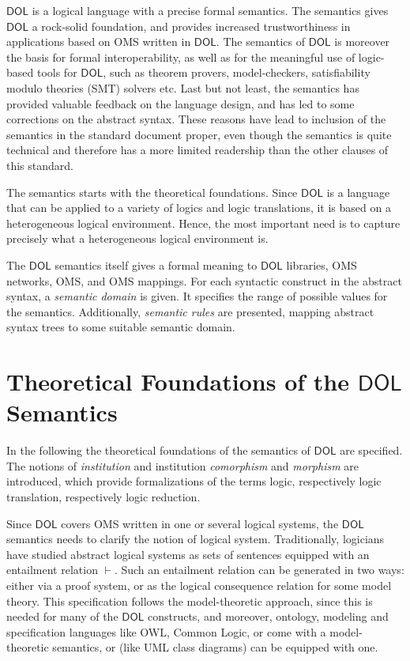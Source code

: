 \documentclass[10pt,fleqn,final]{scrreprt}
\newcommand{\cbs}[0]{\color{red}\xspace} %
\newcommand{\cbe}[0]{\color{black}\xspace} %
\newcommand*{\termref}[1]{\index{#1}#1\xspace}
\newcommand*{\DOL}{\ensuremath{\mathsf{DOL}}\xspace}
\newcommand{\sclause}[1]{\section{#1}}
\newenvironment{definitions}[0]{\medskip }{}
\begin{document}
\begin{definitions}
\DOL is a logical language with a precise formal semantics.  The
semantics gives \DOL a rock-solid foundation, and provides increased
trustworthiness in applications based on OMS written in \DOL.  The
semantics of \DOL is moreover the basis for formal interoperability, as
well as for the meaningful use of logic-based tools for \DOL, such as
theorem provers, model-checkers,\cbs satisfiability modulo theories (SMT)\cbe solvers etc.  Last but not least,
the semantics has provided valuable feedback on the language design,
and has led to some corrections on the abstract syntax.  These
reasons have lead to inclusion of the semantics in the standard
document proper, even though the semantics is quite technical and
therefore has a more limited readership than the other clauses of
this standard.

The semantics starts with the theoretical foundations. Since \DOL is a
language that can be applied to a variety of logics and logic
translations, it is based on\cbs a\cbe heterogeneous logical environment.
Hence, the most important need is to capture precisely what a
heterogeneous logical environment is.

The \DOL semantics itself gives a formal meaning to \DOL libraries, OMS
networks, OMS, and OMS mappings. For each syntactic construct
in the abstract syntax,
a \emph{semantic domain} is given. It specifies the range of possible
values for the semantics. Additionally, \emph{semantic rules} are
presented, mapping abstract syntax trees to some suitable semantic
domain.

\sclause{Theoretical Foundations of the \DOL Semantics}
\label{s:foundations}

\cbs In the following the theoretical foundations of the semantics of \DOL are  specified.\cbe
The notions of \emph{institution} and institution 
\emph{comorphism} and \emph{morphism} are introduced, which provide formalizations of the terms 
\termref{logic}, respectively \termref{logic translation}, respectively  \termref{logic reduction}. 

Since \DOL covers OMS written in one or several logical systems, the
\DOL semantics needs to clarify the notion of logical
system. Traditionally, logicians have studied abstract logical systems
as sets of sentences equipped with an entailment relation
$\vdash$. Such an entailment relation can be generated in two ways:
either via a proof system, or as the logical consequence relation for
some model theory.\cbs  This specification follows\cbe the model-theoretic approach, since
this is needed for many of the \DOL constructs, and moreover, ontology,
modeling and specification languages like OWL, Common Logic, or \CASL
come with a model-theoretic semantics, or (like UML class diagrams)
can be equipped with one.


\end{definitions}
\end{document}
